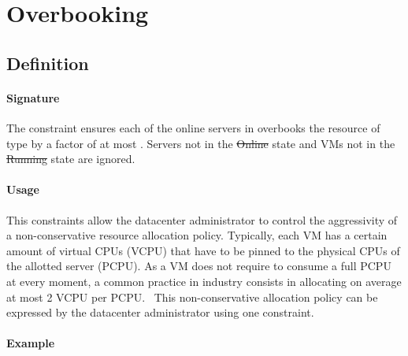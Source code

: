 \section{Overbooking}

\subsection{Definition}

\paragraph{Signature} 

The  constraint ensures each of the online servers in  overbooks the
resource of type  by a factor of at most .
Servers not in the \st{Online} state and VMs not in the \st{Running} state are ignored.

\paragraph{Usage}

This constraints allow the datacenter administrator to control the aggressivity of a non-conservative resource allocation policy. Typically, each VM has a certain amount of virtual CPUs (VCPU) that have to be
pinned to the physical CPUs of the allotted server (PCPU). As a VM does not require to consume a full
PCPU at every moment, a common practice in industry consists in allocating on average at most 2 VCPU per PCPU.~\cite{vmi} This non-conservative allocation policy can be expressed by the datacenter administrator using one
 constraint.



\paragraph{Example}

